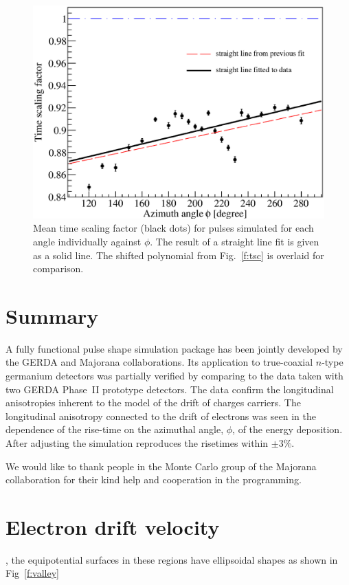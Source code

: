 \documentclass[epj]{svjour}
\begin{document}
\begin{figure}[htpb]
\centering
\includegraphics[width=\linewidth]{tsline}
\caption{Mean time scaling factor (black dots) for pulses simulated
for each angle individually against $\phi$. The result of a straight
line fit is given as a solid line. The shifted polynomial from
Fig.~\ref{f:tsc} is overlaid for comparison.}
\label{f:tsl}
\end{figure}

\section{Summary}
\label{s:sum}
A fully functional pulse shape simulation package has been jointly
developed by the GERDA and Majorana collaborations. Its application to
true-coaxial $n$-type germanium detectors was partially verified by
comparing to the data taken with two GERDA Phase~II prototype
detectors. The data confirm the longitudinal anisotropies inherent to
the model of the drift of charges carriers. The longitudinal
anisotropy connected to the drift of electrons was seen in the
dependence of the rise-time on the azimuthal angle, $\phi$, of the
energy deposition. After adjusting the simulation reproduces the
risetimes within $\pm$3\%.

\begin{acknowledgement}
We would like to thank people in the Monte Carlo group of the Majorana
collaboration for their kind help and cooperation in the programming.
\end{acknowledgement}

\appendix

\section{Electron drift velocity}
\label{s:elec} 
, the equipotential surfaces in these regions have
ellipsoidal shapes as shown in Fig~\ref{f:valley}
\end{document}
